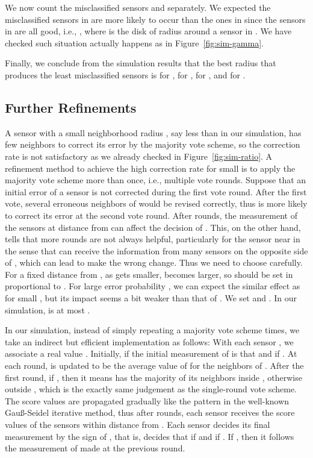 \documentclass{article}
\begin{document}
\par
We now count the misclassified sensors  and  separately. We expected the misclassified sensors in  are more likely to occur than the ones in  since the sensors in  are all good, i.e., , where  is the disk of radius  around a sensor in . We have checked such situation actually happens as in Figure~\ref{fig:sim-gamma}.

\par
Finally, we conclude from the simulation results that the best radius  that produces the least misclassified sensors is  for ,  for ,  for , and  for .

\subsection{Further Refinements}

A sensor with a small neighborhood radius , say less than  in our simulation, has few neighbors to correct its error by the majority vote scheme, so the correction rate is not satisfactory as we already checked in Figure~\ref{fig:sim-ratio}. A refinement method to achieve the high correction rate for small  is to apply the majority vote scheme more than once, i.e., multiple vote rounds. Suppose that an initial error of a sensor  is not corrected during the first vote round. After the first vote, several erroneous neighbors of  would be revised correctly, thus  is more likely to correct its error at the second vote round. After  rounds, the measurement of the sensors at distance  from  can affect the decision of . This, on the other hand, tells that more rounds are not always helpful, particularly for the sensor  near  in the sense that  can receive the information from many sensors on the opposite side of , which can lead  to make the wrong change. Thus we need to choose  carefully. For a fixed distance from , as  gets smaller,  becomes larger, so  should be set in proportional to . For large error probability , we can expect the similar effect as for small , but its impact seems a bit weaker than that of . We set  and . In our simulation,  is at most .

\par
In our simulation, instead of simply repeating a majority vote scheme  times, we take an indirect but efficient implementation as follows: With each sensor , we associate a real value . Initially,  if the initial measurement of  is that  and  if . At each round,  is updated to be the average value of  for the neighbors  of . After the first round, if , then it means  has the majority of its neighbors inside , otherwise outside , which is the exactly same judgement as the single-round vote scheme. The score values are propagated gradually like the pattern in the well-known Gau{\ss}-Seidel iterative method, thus after  rounds, each sensor  receives the score values of the sensors within distance  from . Each sensor  decides its final measurement by the sign of , that is, decides that  if  and  if . If , then it follows the measurement of  made at the previous round.
\end{document}
